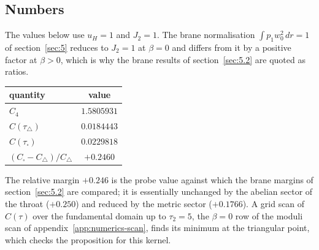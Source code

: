 \subsection{Numbers}
\label{app:probe-numbers}

The values below use $u_H = 1$ and $J_2 = 1$. The brane normalisation
$\int p_1 w_0^2\,dr = 1$ of section~\ref{sec:5} reduces to $J_2 = 1$ at
$\beta = 0$ and differs from it by a positive factor at $\beta > 0$, which is
why the brane results of section~\ref{sec:5.2} are quoted as ratios.

\begin{center}
\begin{tabular}{lc}
\toprule
quantity & value \\
\midrule
$C_4$ & $1.5805931$ \\
$C(\tau_\triangle)$ & $0.0184443$ \\
$C(\tau_\square)$ & $0.0229818$ \\
$(C_\square - C_\triangle)/C_\triangle$ & $+0.2460$ \\
\bottomrule
\end{tabular}
\end{center}
The relative margin $+0.246$ is the probe value against which the brane
margins of section~\ref{sec:5.2} are compared; it is essentially unchanged by the
abelian sector of the throat ($+0.250$) and reduced by the metric sector
($+0.1766$). A grid scan of $C(\tau)$ over the fundamental domain
up to $\tau_2 = 5$, the $\beta = 0$ row of the moduli scan of
appendix~\ref{app:numerics-scan}, finds its minimum at the
triangular point, which checks the proposition for this kernel.
